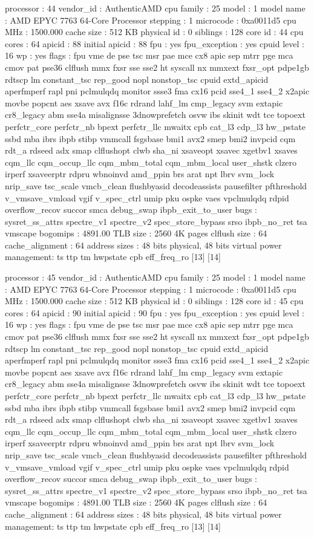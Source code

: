 processor	: 44
vendor_id	: AuthenticAMD
cpu family	: 25
model		: 1
model name	: AMD EPYC 7763 64-Core Processor
stepping	: 1
microcode	: 0xa0011d5
cpu MHz		: 1500.000
cache size	: 512 KB
physical id	: 0
siblings	: 128
core id		: 44
cpu cores	: 64
apicid		: 88
initial apicid	: 88
fpu		: yes
fpu_exception	: yes
cpuid level	: 16
wp		: yes
flags		: fpu vme de pse tsc msr pae mce cx8 apic sep mtrr pge mca cmov pat pse36 clflush mmx fxsr sse sse2 ht syscall nx mmxext fxsr_opt pdpe1gb rdtscp lm constant_tsc rep_good nopl nonstop_tsc cpuid extd_apicid aperfmperf rapl pni pclmulqdq monitor ssse3 fma cx16 pcid sse4_1 sse4_2 x2apic movbe popcnt aes xsave avx f16c rdrand lahf_lm cmp_legacy svm extapic cr8_legacy abm sse4a misalignsse 3dnowprefetch osvw ibs skinit wdt tce topoext perfctr_core perfctr_nb bpext perfctr_llc mwaitx cpb cat_l3 cdp_l3 hw_pstate ssbd mba ibrs ibpb stibp vmmcall fsgsbase bmi1 avx2 smep bmi2 invpcid cqm rdt_a rdseed adx smap clflushopt clwb sha_ni xsaveopt xsavec xgetbv1 xsaves cqm_llc cqm_occup_llc cqm_mbm_total cqm_mbm_local user_shstk clzero irperf xsaveerptr rdpru wbnoinvd amd_ppin brs arat npt lbrv svm_lock nrip_save tsc_scale vmcb_clean flushbyasid decodeassists pausefilter pfthreshold v_vmsave_vmload vgif v_spec_ctrl umip pku ospke vaes vpclmulqdq rdpid overflow_recov succor smca debug_swap ibpb_exit_to_user
bugs		: sysret_ss_attrs spectre_v1 spectre_v2 spec_store_bypass srso ibpb_no_ret tsa vmscape
bogomips	: 4891.00
TLB size	: 2560 4K pages
clflush size	: 64
cache_alignment	: 64
address sizes	: 48 bits physical, 48 bits virtual
power management: ts ttp tm hwpstate cpb eff_freq_ro [13] [14]

processor	: 45
vendor_id	: AuthenticAMD
cpu family	: 25
model		: 1
model name	: AMD EPYC 7763 64-Core Processor
stepping	: 1
microcode	: 0xa0011d5
cpu MHz		: 1500.000
cache size	: 512 KB
physical id	: 0
siblings	: 128
core id		: 45
cpu cores	: 64
apicid		: 90
initial apicid	: 90
fpu		: yes
fpu_exception	: yes
cpuid level	: 16
wp		: yes
flags		: fpu vme de pse tsc msr pae mce cx8 apic sep mtrr pge mca cmov pat pse36 clflush mmx fxsr sse sse2 ht syscall nx mmxext fxsr_opt pdpe1gb rdtscp lm constant_tsc rep_good nopl nonstop_tsc cpuid extd_apicid aperfmperf rapl pni pclmulqdq monitor ssse3 fma cx16 pcid sse4_1 sse4_2 x2apic movbe popcnt aes xsave avx f16c rdrand lahf_lm cmp_legacy svm extapic cr8_legacy abm sse4a misalignsse 3dnowprefetch osvw ibs skinit wdt tce topoext perfctr_core perfctr_nb bpext perfctr_llc mwaitx cpb cat_l3 cdp_l3 hw_pstate ssbd mba ibrs ibpb stibp vmmcall fsgsbase bmi1 avx2 smep bmi2 invpcid cqm rdt_a rdseed adx smap clflushopt clwb sha_ni xsaveopt xsavec xgetbv1 xsaves cqm_llc cqm_occup_llc cqm_mbm_total cqm_mbm_local user_shstk clzero irperf xsaveerptr rdpru wbnoinvd amd_ppin brs arat npt lbrv svm_lock nrip_save tsc_scale vmcb_clean flushbyasid decodeassists pausefilter pfthreshold v_vmsave_vmload vgif v_spec_ctrl umip pku ospke vaes vpclmulqdq rdpid overflow_recov succor smca debug_swap ibpb_exit_to_user
bugs		: sysret_ss_attrs spectre_v1 spectre_v2 spec_store_bypass srso ibpb_no_ret tsa vmscape
bogomips	: 4891.00
TLB size	: 2560 4K pages
clflush size	: 64
cache_alignment	: 64
address sizes	: 48 bits physical, 48 bits virtual
power management: ts ttp tm hwpstate cpb eff_freq_ro [13] [14]

